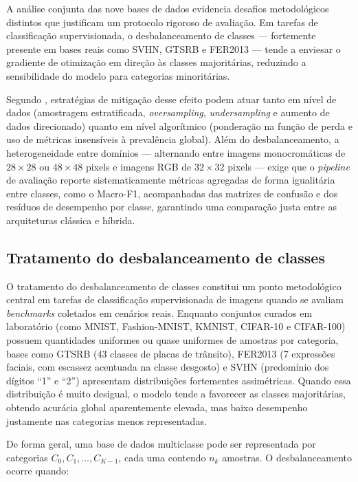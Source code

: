 \documentclass[
    12pt,
    openright,
    oneside,
    a4paper,
    english,
    brazil
]{abntex2}
\begin{document}
A análise conjunta das nove bases de dados evidencia desafios metodológicos distintos que justificam um protocolo rigoroso de avaliação. Em tarefas de classificação supervisionada, o desbalanceamento de classes --- fortemente presente em bases reais como SVHN, GTSRB e FER2013 --- tende a enviesar o gradiente de otimização em direção às classes majoritárias, reduzindo a sensibilidade do modelo para categorias minoritárias.

Segundo , estratégias de mitigação desse efeito podem atuar tanto em nível de dados (amostragem estratificada, \textit{oversampling}, \textit{undersampling} e aumento de dados direcionado) quanto em nível algorítmico (ponderação na função de perda e uso de métricas insensíveis à prevalência global). Além do desbalanceamento, a heterogeneidade entre domínios --- alternando entre imagens monocromáticas de \(28 \times 28\) ou \(48 \times 48\) pixels e imagens RGB de \(32 \times 32\) pixels --- exige que o \textit{pipeline} de avaliação reporte sistematicamente métricas agregadas de forma igualitária entre classes, como o Macro-F1, acompanhadas das matrizes de confusão e dos resíduos de desempenho por classe, garantindo uma comparação justa entre as arquiteturas clássica e híbrida.

\subsection{Tratamento do desbalanceamento de classes}
\label{subsec:tratamento_desbalanceamento_classes}

O tratamento do desbalanceamento de classes constitui um ponto metodológico central em tarefas de classificação supervisionada de imagens quando se avaliam \textit{benchmarks} coletados em cenários reais. Enquanto conjuntos curados em laboratório (como MNIST, Fashion-MNIST, KMNIST, CIFAR-10 e CIFAR-100) possuem quantidades uniformes ou quase uniformes de amostras por categoria, bases como GTSRB (43 classes de placas de trânsito), FER2013 (7 expressões faciais, com escassez acentuada na classe desgosto) e SVHN (predomínio dos dígitos ``1'' e ``2'') apresentam distribuições fortementes assimétricas. Quando essa distribuição é muito desigual, o modelo tende a favorecer as classes majoritárias, obtendo acurácia global aparentemente elevada, mas baixo desempenho justamente nas categorias menos representadas.

De forma geral, uma base de dados multiclasse pode ser representada por categorias \(C_0, C_1, \ldots, C_{K-1}\), cada uma contendo \(n_k\) amostras. O desbalanceamento ocorre quando:
\end{document}
